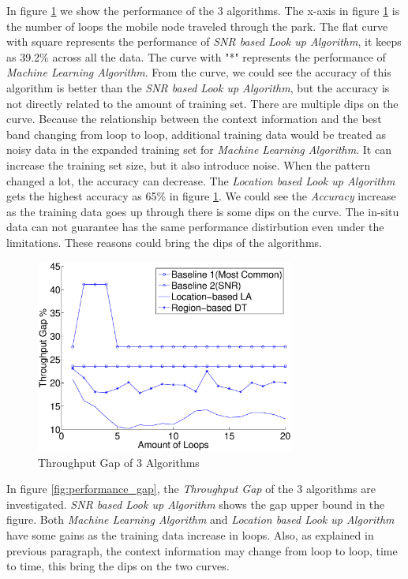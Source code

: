In figure \ref{fig:performance} we show the performance of the 3 algorithms. 
The x-axis in figure \ref{fig:performance} is the number of loops the mobile node traveled through the park. 
The flat curve with square represents the performance of \emph{SNR based Look up Algorithm}, it keeps as 39.2\% across all the data.
The curve with "*" represents the performance of \emph{Machine Learning Algorithm}. From the curve, we could see the accuracy of this algorithm is better than the \emph{SNR based Look up Algorithm}, but the accuracy is not directly related to the amount of training set. 
There are multiple dips on the curve. 
Because the relationship between the context information and the best band changing from loop to loop, additional training data would be treated as noisy data in the expanded training set for \emph{Machine Learning Algorithm}. It can increase the training set size, but it also introduce noise. When the pattern changed a lot, the accuracy can decrease.
The \emph{Location based Look up Algorithm} gets the highest accuracy as 65\% in figure \ref{fig:performance}. We could see the \emph{Accuracy} increase as the training data goes up through there is some dips on the curve. The in-situ data can not guarantee has the same performance distirbution even under the limitations. These reasons could bring the dips of the algorithms. 


\begin{figure}
\centering
\includegraphics[width=85mm]{figure/performance_gap}
\caption{Throughput Gap of 3 Algorithms}
\label{fig:performance}
\end{figure}

In figure \ref{fig:performance_gap}, the \emph{Throughput Gap} of the 3 algorithms are investigated. \emph{SNR based Look up Algorithm} shows the gap upper bound in the figure. Both \emph{Machine Learning Algorithm} and \emph{Location based Look up Algorithm} have some gains as the training data increase in loops. Also, as explained in previous paragraph, the context information may change from loop to loop, time to time, this bring the dips on the two curves. 


